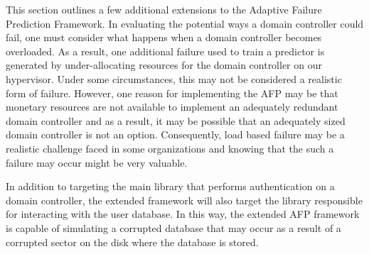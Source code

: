 This section outlines a few additional extensions to the Adaptive Failure
Prediction Framework.  In evaluating the potential ways a domain controller
could fail, one must consider what happens when a domain controller becomes
overloaded.  As a result, one additional failure used to train a predictor is
generated by under-allocating resources for the domain controller on our
hypervisor.  Under some circumstances, this may not be considered a realistic
form of failure.  However, one reason for implementing the AFP may be that
monetary resources are not available to implement an adequately redundant
domain controller and as a result, it may be possible that an adequately sized
domain controller is not an option.  Consequently, load based failure may be a
realistic challenge faced in some organizations and knowing that the such a
failure may occur might be very valuable.

In addition to targeting the main library that performs authentication on a
domain controller, the extended framework will also target the library
responsible for interacting with the user database.  In this way, the extended
AFP framework is capable of simulating a corrupted database that may occur as a
result of a corrupted sector on the disk where the database is stored.
